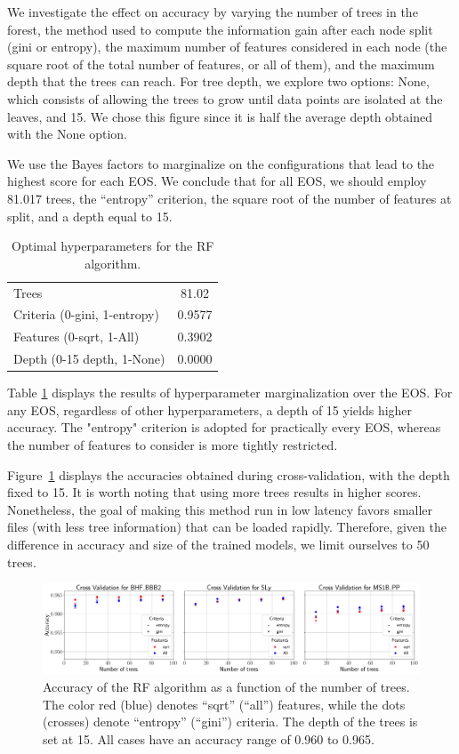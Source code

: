 We investigate the effect on accuracy by varying the number of trees in the forest, the method used to compute the information gain after each node split (gini or entropy), the maximum number of features considered in each node (the square root of the total number of features, or all of them), and the maximum depth that the trees can reach. For tree depth, we explore two options: None, which consists of allowing the trees to grow until data points are isolated at the leaves, and 15. We chose this figure since it is half the average depth obtained with the None option.

We use the Bayes factors to marginalize on the configurations that lead to the highest score for each \ac{EOS}. We conclude that for all \ac{EOS}, we should employ 81.017 trees, the ``entropy'' criterion, the square root of the number of features at split, and a depth equal to 15.


\begin{table}[h]
\begin{tabular}{|l|c|}
\hline
Trees& 81.02 \\
Criteria (0-gini, 1-entropy)& 0.9577 \\
Features (0-sqrt, 1-All)& 0.3902  \\
Depth (0-15 depth, 1-None)& 0.0000 \\ \hline
\end{tabular}
\caption{Optimal hyperparameters for the \ac{RF} algorithm. \label{tab:RF_cross_params}}
\end{table}

Table \ref{tab:RF_cross_params} displays the results of hyperparameter marginalization over the \ac{EOS}. For any \ac{EOS}, regardless of other hyperparameters, a depth of 15 yields higher accuracy. The "entropy" criterion is adopted for practically every \ac{EOS}, whereas the number of features to consider is more tightly restricted.

Figure~\ref{fig:crossvalRF} displays the accuracies obtained during cross-validation, with the depth fixed to 15. It is worth noting that using more trees results in higher scores. Nonetheless, the goal of making this method run in low latency favors smaller files (with less tree information) that can be loaded rapidly. Therefore, given the difference in accuracy and size of the trained models, we limit ourselves to 50 trees.

\begin{figure}%
\includegraphics[width=\linewidth]{cross_val_RF}
\caption{Accuracy of the \ac{RF} algorithm as a function of the number of trees.  The color red (blue) denotes ``sqrt'' (``all'') features, while the dots (crosses) denote ``entropy'' (``gini'') criteria. The depth of the trees is set at 15. All cases have an accuracy range of 0.960 to 0.965.}
\label{fig:crossvalRF}
\end{figure}

